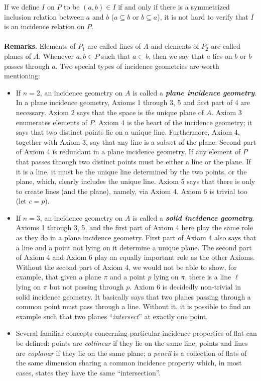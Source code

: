 \documentclass[12pt]{article}
\begin{document}
If we define $I$ on $P$ to be $(a,b)\in I$ if and only if  there is a symmetrized inclusion relation between $a$ and $b$ ($a\subseteq b$ or $b\subseteq a$), it is not hard to verify that $I$ is an incidence relation on $P$.
\\\\
\textbf{Remarks}.  Elements of $P_1$ are called lines of $A$ and elements of $P_2$ are called planes of $A$.  Whenever $a,b\in P$ such that $a\subset b$, then we say that $a$ lies on $b$ or $b$ passes through $a$.  Two special types of incidence geometries are worth mentioning:

\begin{itemize}
\item If $n=2$, an incidence geometry on $A$ is called a \textbf{\emph{plane incidence geometry}}.  In a plane incidence geometry, Axioms 1 through 3, 5 and first part of 4 are necessary.  Axiom 2 says that the space is \emph{the} unique plane of $A$.  Axiom 3 enumerates elements of $P$.  Axiom 4 is the heart of the incidence geometry; it
says that two distinct points lie on a unique line.  Furthermore, Axiom 4, together with Axiom 3, say that any line is a subset of the plane.  Second part of Axiom 4 is redundant in a plane incidence geometry.  If any element of $P$ that passes through two distinct points must be either a line or the plane. If it is a line, it must be the unique line determined by the two points, or the plane, which, clearly includes the unique line.  Axiom 5 says that there is
only  to create lines (and the plane), namely, via Axiom 4.  Axiom 6 is trivial too (let $c=p$).
\item If $n=3$, an incidence geometry on $A$ is called a \textbf{\emph{solid incidence geometry}}.  Axioms 1 through 3, 5, and the first part of Axiom 4 here play the same role as they do in a plane incidence geometry.  First part of Axiom 4 also says that a line and a point not lying on it determine a unique plane.  The second part of Axiom 4 and Axiom 6 play an equally important role as the other Axioms.  Without the second part of Axiom 4, we would not be able to show, for example, that given a plane $\pi$ and a point $p$ lying on $\pi$, there is a line $\ell$ lying on $\pi$ but not passing through $p$.  Axiom 6 is decidedly non-trivial in solid incidence geometry.  It basically says that two planes passing through a common point must pass through a line.  Without it, it is possible to find an example such that two planes ``\emph{intersect}'' at exactly one point.
\item Several familiar concepts concerning particular incidence properties of flat can be defined: points are \emph{collinear} if they lie on the same line; points and lines are \emph{coplanar} if they lie on the same plane; a \emph{pencil} is a collection of flats of the same dimension sharing a common incidence property which, in most cases, states they have the same ``intersection''.
\end{itemize}
\end{document}
